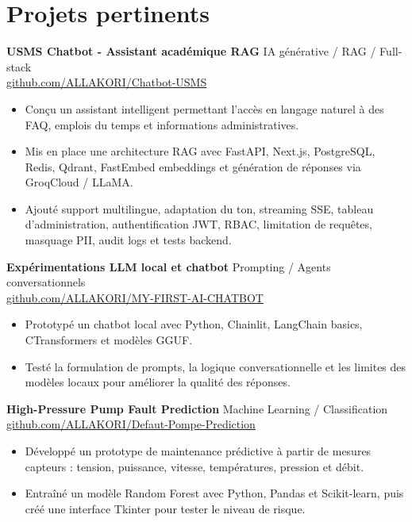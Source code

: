 \documentclass[10pt,a4paper]{article}
\begin{document}
\section{Projets pertinents}
\textbf{USMS Chatbot - Assistant académique RAG} \hfill IA générative / RAG / Full-stack\\
\href{https://github.com/ALLAKORI/Chatbot-USMS}{github.com/ALLAKORI/Chatbot-USMS}
\begin{itemize}
  \item Conçu un assistant intelligent permettant l'accès en langage naturel à des FAQ, emplois du temps et informations administratives.
  \item Mis en place une architecture RAG avec FastAPI, Next.js, PostgreSQL, Redis, Qdrant, FastEmbed embeddings et génération de réponses via GroqCloud / LLaMA.
  \item Ajouté support multilingue, adaptation du ton, streaming SSE, tableau d'administration, authentification JWT, RBAC, limitation de requêtes, masquage PII, audit logs et tests backend.
\end{itemize}

\textbf{Expérimentations LLM local et chatbot} \hfill Prompting / Agents conversationnels\\
\href{https://github.com/ALLAKORI/MY-FIRST-AI-CHATBOT}{github.com/ALLAKORI/MY-FIRST-AI-CHATBOT}
\begin{itemize}
  \item Prototypé un chatbot local avec Python, Chainlit, LangChain basics, CTransformers et modèles GGUF.
  \item Testé la formulation de prompts, la logique conversationnelle et les limites des modèles locaux pour améliorer la qualité des réponses.
\end{itemize}

\textbf{High-Pressure Pump Fault Prediction} \hfill Machine Learning / Classification\\
\href{https://github.com/ALLAKORI/Defaut-Pompe-Prediction}{github.com/ALLAKORI/Defaut-Pompe-Prediction}
\begin{itemize}
  \item Développé un prototype de maintenance prédictive à partir de mesures capteurs : tension, puissance, vitesse, températures, pression et débit.
  \item Entraîné un modèle Random Forest avec Python, Pandas et Scikit-learn, puis créé une interface Tkinter pour tester le niveau de risque.
\end{itemize}
\end{document}
